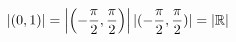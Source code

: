 \documentclass[preview]{standalone}
\begin{document}
\begin{align*}
|(0, 1)| = \left|\left(-\frac{\pi}{2}, \frac{\pi}{2}\right)\right| \newline |(-\frac{\pi}{2}, \frac{\pi}{2})| = |\mathbb R|
\end{align*}
\end{document}
